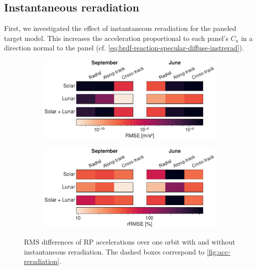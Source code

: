 \subsection{Instantaneous reradiation}
\label{subsec:inst-rerad}

First, we investigated the effect of instantaneous reradiation for the paneled target model. This increases the acceleration proportional to each panel's $C_a$ in a direction normal to the panel (cf. \cref{eq:brdf-reaction-specular-diffuse-instrerad}).

\begin{figure}[t]
    \centering
    \begin{subfigure}[c]{\linewidth}
        \includegraphics[width=\textwidth]{figures/plots/acc_reradiation_rms.pdf}
     \end{subfigure}

     \bigskip

     \begin{subfigure}[c]{\linewidth}
        \includegraphics[width=\textwidth]{figures/plots/acc_reradiation_rrms.pdf}
     \end{subfigure}
    \caption{RMS differences of \gls{RP} accelerations over one orbit with and without instantaneous reradiation. The dashed boxes correspond to \cref{fig:acc-reradiation}.}
    \label{fig:acc-reradiation-rms}
\end{figure}


